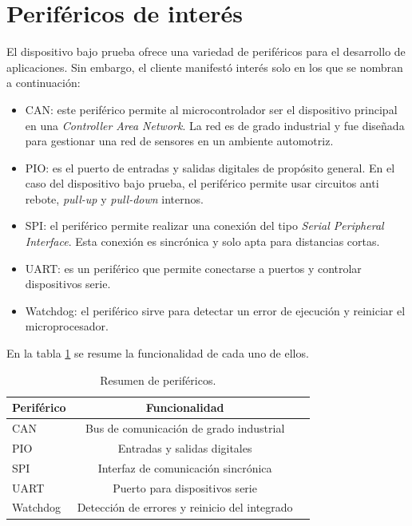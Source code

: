 \section{Periféricos de interés}
\label{sec:perifericos}

El dispositivo bajo prueba ofrece una variedad de periféricos para el desarrollo de aplicaciones.
Sin embargo, el cliente manifestó interés solo en los que se nombran a continuación:
\begin{itemize}
    \item CAN: este periférico permite al microcontrolador ser el dispositivo principal en una \emph{Controller Area Network}. La red es de grado industrial y fue diseñada para gestionar una red de sensores en un ambiente automotriz.
    \item PIO: es el puerto de entradas y salidas digitales de propósito general. En el caso del dispositivo bajo prueba, el periférico permite usar circuitos anti rebote, \emph{pull-up} y \emph{pull-down} internos. 
    \item SPI: el periférico permite realizar una conexión del tipo \emph{Serial Peripheral Interface}. Esta conexión es sincrónica y solo apta para distancias cortas.
    \item UART: es un periférico que permite conectarse a puertos y controlar dispositivos serie.
    \item Watchdog: el periférico sirve para detectar un error de ejecución y reiniciar el microprocesador.
\end{itemize}

En la tabla \ref{tab:perifericosresumen} se resume la funcionalidad de cada uno de ellos.

\begin{table}[h]
	\centering
	\caption[Resumen de periféricos]{Resumen de periféricos.}
	\begin{tabular}{l c c}    
		\toprule
        \textbf{Periférico} & \textbf{Funcionalidad}\\
		\midrule
		CAN                 & Bus de comunicación de grado industrial\\        	
		PIO                 & Entradas y salidas digitales\\
		SPI                 & Interfaz de comunicación sincrónica\\
		UART                & Puerto para dispositivos serie\\
		Watchdog            & Detección de errores y reinicio del integrado\\
		\bottomrule
		\hline
	\end{tabular}
	\label{tab:perifericosresumen}
\end{table}

